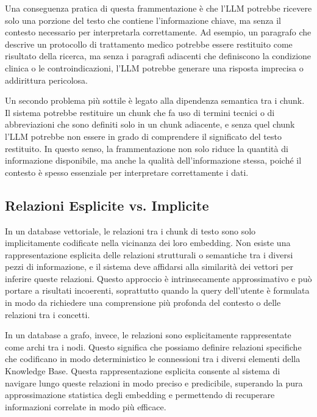 Una conseguenza pratica di questa frammentazione è che l'LLM potrebbe ricevere solo una porzione del testo che contiene l'informazione chiave, ma senza il contesto necessario per interpretarla correttamente. Ad esempio, un paragrafo che descrive un protocollo di trattamento medico potrebbe essere restituito come risultato della ricerca, ma senza i paragrafi adiacenti che definiscono la condizione clinica o le controindicazioni, l'LLM potrebbe generare una risposta imprecisa o addirittura pericolosa.

Un secondo problema più sottile è legato alla dipendenza semantica tra i chunk. Il sistema potrebbe restituire un chunk che fa uso di termini tecnici o di abbreviazioni che sono definiti solo in un chunk adiacente, e senza quel chunk l'LLM potrebbe non essere in grado di comprendere il significato del testo restituito. In questo senso, la frammentazione non solo riduce la quantità di informazione disponibile, ma anche la qualità dell'informazione stessa, poiché il contesto è spesso essenziale per interpretare correttamente i dati.

\subsection{Relazioni Esplicite vs. Implicite}

In un database vettoriale, le relazioni tra i chunk di testo sono solo implicitamente codificate nella vicinanza dei loro embedding. Non esiste una rappresentazione esplicita delle relazioni strutturali o semantiche tra i diversi pezzi di informazione, e il sistema deve affidarsi alla similarità dei vettori per inferire queste relazioni. Questo approccio è intrinsecamente approssimativo e può portare a risultati incoerenti, soprattutto quando la query dell'utente è formulata in modo da richiedere una comprensione più profonda del contesto o delle relazioni tra i concetti.

In un database a grafo, invece, le relazioni sono esplicitamente rappresentate come archi tra i nodi. Questo significa che possiamo definire relazioni specifiche che codificano in modo deterministico le connessioni tra i diversi elementi della Knowledge Base. Questa rappresentazione esplicita consente al sistema di navigare lungo queste relazioni in modo preciso e predicibile, superando la pura approssimazione statistica degli embedding e permettendo di recuperare informazioni correlate in modo più efficace.

